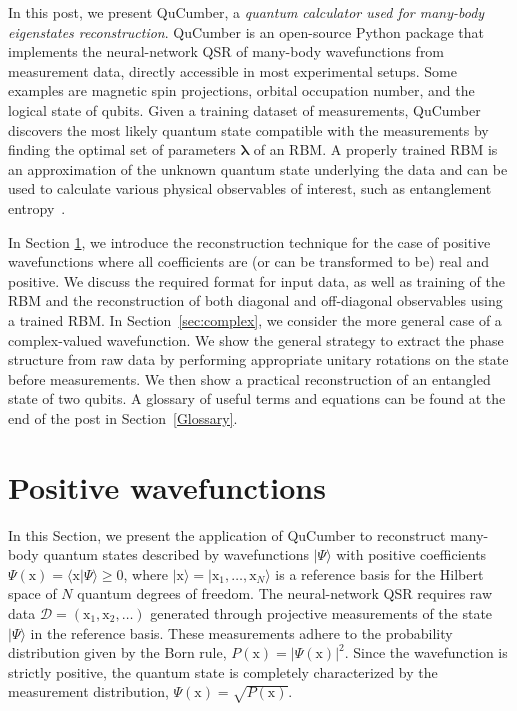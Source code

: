\documentclass[submission, Phys, hidelnks]{SciPost}
\begin{document}
In this post, we present QuCumber, a {\it quantum calculator used for many-body eigenstates reconstruction}. QuCumber is an open-source Python package that implements the neural-network QSR of many-body wavefunctions from measurement data, directly accessible in most experimental setups. Some examples are magnetic spin projections, orbital occupation number, and the logical state of qubits. Given a training dataset of measurements, QuCumber discovers the most likely quantum state compatible with the measurements by finding the optimal set of parameters $\bm{\lambda}$ of an RBM. A properly trained RBM is an approximation of the unknown quantum state underlying the data and can be used to calculate various physical observables of interest, such as entanglement entropy~\cite{torlai2018tomography}.

In Section \ref{sec:positive}, we introduce the reconstruction technique for the case of positive wavefunctions where all coefficients are (or can be transformed to be) real and positive. We discuss the required format for input data, as well as training of the RBM and the reconstruction of both diagonal and off-diagonal observables using a trained RBM. In Section~\ref{sec:complex}, we consider the more general case of a complex-valued wavefunction. We show the general strategy to extract the phase structure from raw data by performing appropriate unitary rotations on the state before measurements. We then show a practical reconstruction of an entangled state of two qubits. A glossary of useful terms and equations can be found at the end of the post in Section~\ref{Glossary}.

\section{Positive wavefunctions}\label{sec:positive}
In this Section, we present the application of QuCumber to reconstruct many-body quantum states described by wavefunctions $|\Psi\rangle$ with positive coefficients $\Psi(\bm{\mathrm{x}})=\langle\bm{\mathrm{x}}|\Psi\rangle \ge0$, where $|\bm{\mathrm{x}}\rangle=|\mathrm{x}_1,\dots,\mathrm{x}_N\rangle$ is a reference basis for the Hilbert space of $N$ quantum degrees of freedom. The neural-network QSR requires raw data $\mathcal{D}=(\bm{\mathrm{x}}_1,\bm{\mathrm{x}}_2,\dots)$ generated through projective measurements of the state $|\Psi\rangle$ in the reference basis. These measurements adhere to the probability distribution given by the Born rule, $P(\bm{\mathrm{x}})=|\Psi(\bm{\mathrm{x}})|^2$. Since the wavefunction is strictly positive, the quantum state is completely characterized by the measurement distribution, $\Psi(\bm{\mathrm{x}})=\sqrt{P(\bm{\mathrm{x}})}$. 
\end{document}

